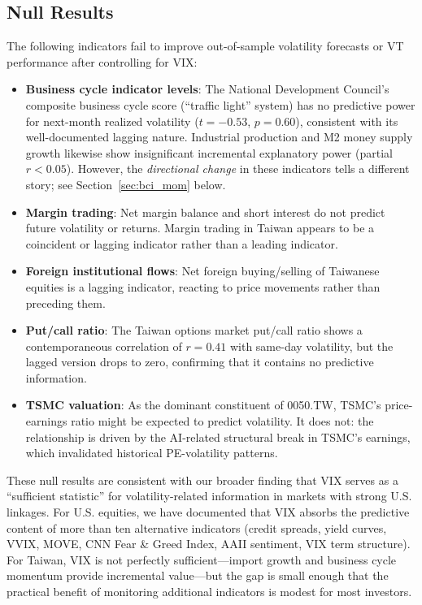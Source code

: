\subsection{Null Results}

The following indicators fail to improve out-of-sample volatility forecasts or VT performance after controlling for VIX:

\begin{itemize}
    \item \textbf{Business cycle indicator levels}: The National Development Council's composite business cycle score (``traffic light'' system) has no predictive power for next-month realized volatility ($t = -0.53$, $p = 0.60$), consistent with its well-documented lagging nature. Industrial production and M2 money supply growth likewise show insignificant incremental explanatory power (partial $r < 0.05$). However, the \textit{directional change} in these indicators tells a different story; see Section~\ref{sec:bci_mom} below.
    \item \textbf{Margin trading}: Net margin balance and short interest do not predict future volatility or returns. Margin trading in Taiwan appears to be a coincident or lagging indicator rather than a leading indicator.
    \item \textbf{Foreign institutional flows}: Net foreign buying/selling of Taiwanese equities is a lagging indicator, reacting to price movements rather than preceding them.
    \item \textbf{Put/call ratio}: The Taiwan options market put/call ratio shows a contemporaneous correlation of $r = 0.41$ with same-day volatility, but the lagged version drops to zero, confirming that it contains no predictive information.
    \item \textbf{TSMC valuation}: As the dominant constituent of 0050.TW, TSMC's price-earnings ratio might be expected to predict volatility. It does not: the relationship is driven by the AI-related structural break in TSMC's earnings, which invalidated historical PE-volatility patterns.
\end{itemize}

These null results are consistent with our broader finding that VIX serves as a ``sufficient statistic'' for volatility-related information in markets with strong U.S. linkages. For U.S. equities, we have documented that VIX absorbs the predictive content of more than ten alternative indicators (credit spreads, yield curves, VVIX, MOVE, CNN Fear \& Greed Index, AAII sentiment, VIX term structure). For Taiwan, VIX is not perfectly sufficient---import growth and business cycle momentum provide incremental value---but the gap is small enough that the practical benefit of monitoring additional indicators is modest for most investors.


